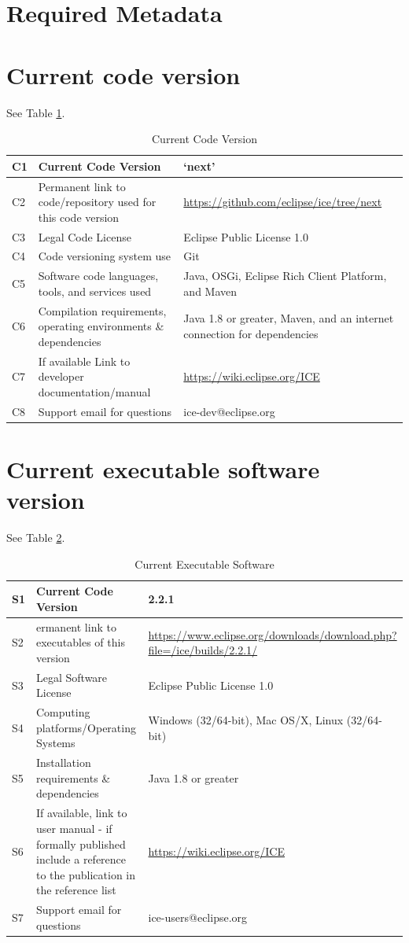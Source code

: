 \section*{Required Metadata}\label{required-metadata}

\section*{Current code version}\label{current-code-version}

See Table \ref{codeTable}.

\begin{table}[!htbp]
\begin{tabularx}{\textwidth}{|l|X|X|}
\hline
C1 & Current Code Version & `next'\tabularnewline\hline
C2 & Permanent link to code/repository used for this code version &
\url{https://github.com/eclipse/ice/tree/next}
\tabularnewline\hline
C3 & Legal Code License & Eclipse Public License 1.0 \tabularnewline\hline
C4 & Code versioning system use & Git \tabularnewline\hline
C5 & Software code languages, tools, and services used & Java, OSGi, Eclipse Rich Client Platform,
and Maven \tabularnewline\hline
C6 & Compilation requirements, operating environments \& dependencies & Java 1.8 or greater, Maven, and
an internet connection for dependencies \tabularnewline\hline 
C7 & If available Link to developer documentation/manual &
\url{https://wiki.eclipse.org/ICE} \tabularnewline\hline 
C8 & Support email for questions & ice-dev@eclipse.org \tabularnewline\hline
\end{tabularx}
\caption{Current Code Version}
\label{codeTable}
\end{table}

\section*{Current executable software
version}\label{current-executable-software-version}

See Table \ref{execTable}.

\begin{table}[!htbp]
\begin{tabularx}{\textwidth}{|l|X|X|}
\hline
S1 & Current Code Version & 2.2.1 \tabularnewline\hline
S2 & ermanent link to executables of this version &
\url{https://www.eclipse.org/downloads/download.php?file=/ice/builds/2.2.1/}
 \tabularnewline\hline 
S3 & Legal Software License & Eclipse Public License 1.0 \tabularnewline\hline
S4 & Computing platforms/Operating Systems & Windows (32/64-bit), Mac OS/X,
Linux (32/64-bit) \tabularnewline\hline 
S5 & Installation requirements \& dependencies & Java 1.8 or
greater \tabularnewline\hline
S6 & If available, link to user manual - if formally published include a
reference to the publication in the reference list &
\url{https://wiki.eclipse.org/ICE} \tabularnewline\hline 
S7 & Support email for questions & ice-users@eclipse.org \tabularnewline\hline
\end{tabularx}
\caption{Current Executable Software}
\label{execTable}
\end{table}

